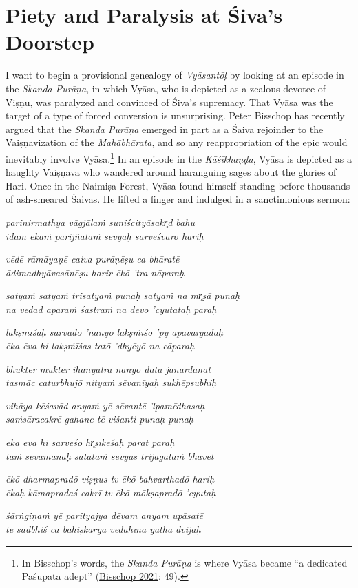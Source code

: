 \section{Piety and Paralysis at Śiva’s Doorstep}
      I want to begin a provisional genealogy of \emph{Vyāsantōḷ} by looking at an episode in the \emph{{Skanda Purāṇa}}, in which Vyāsa, who is depicted as a zealous devotee of Viṣṇu, was paralyzed and convinced of Śiva’s supremacy. That Vyāsa was the target of a type of forced conversion is unsurprising. Peter Bisschop has recently argued that the \emph{{Skanda Purāṇa}} emerged in part as a Śaiva rejoinder to the Vaiṣṇavization of the \emph{Mahābhārata}, and so any reappropriation of the epic would inevitably involve Vyāsa.\footnote{%
In Bisschop’s words, the \emph{{Skanda Purāṇa}} is where Vyāsa became “a dedicated Pāśupata adept” (\hyperref[Bisschop2021]{Bisschop 2021}: 49).
}
 In an episode in the \emph{{Kāśīkhaṇḍa}}, Vyāsa is depicted as a haughty Vaiṣṇava who wandered around haranguing sages about the glories of Hari. Once in the Naimiṣa Forest, Vyāsa found himself standing before thousands of ash-smeared Śaivas. He lifted a finger and indulged in a sanctimonious sermon: 

\begin{pullquote}\raggedright
      \emph{parinirmathya vāgjālaṁ suniścityāsakr̥d bahu}\\
\emph{idam ēkaṁ parijñātaṁ sēvyaḥ sarvēśvarō hariḥ}

\emph{vēdē rāmāyaṇē caiva purāṇēṣu ca bhāratē}\\
\emph{ādimadhyāvasānēṣu harir ēkō ’tra nāparaḥ}

\emph{satyaṁ satyaṁ trisatyaṁ punaḥ satyaṁ na mr̥ṣā punaḥ}\\
\emph{na vēdād aparaṁ śāstraṁ na dēvō ’cyutataḥ paraḥ}

\emph{lakṣmīśaḥ sarvadō ’nānyo lakṣṁīśō ’py apavargadaḥ}\\
\emph{ēka ēva hi lakṣṁīśas tatō ’dhyēyō na cāparaḥ}

\emph{bhuktēr muktēr ihānyatra nānyō dātā janārdanāt}\\
\emph{tasmāc caturbhujō nityaṁ sēvanīyaḥ sukhēpsubhiḥ}

\emph{vihāya kēśavād anyaṁ yē sēvantē ’lpamēdhasaḥ}\\
\emph{saṁsāracakrē gahane tē viśanti punaḥ punaḥ}

\emph{ēka ēva hi sarvēśō hr̥ṣīkēśaḥ parāt paraḥ}\\
\emph{taṁ sēvamānaḥ satataṁ sēvyas trijagatāṁ bhavēt}

\emph{ēkō dharmapradō viṣṇus tv ēkō bahvarthadō hariḥ}\\
\emph{ēkaḥ kāmapradaś cakrī tv ēkō mōkṣapradō ’cyutaḥ}

\emph{śārṅgiṇaṁ yē parityajya dēvam anyam upāsatē}\\
\emph{tē sadbhiś ca bahiṣkāryā vēdahīnā yathā dvijāḥ}
\end{pullquote}
      
